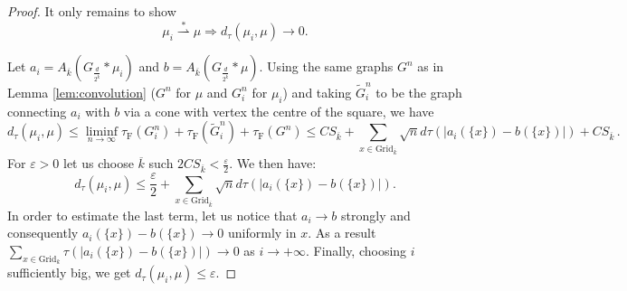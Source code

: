 \documentclass[10pt,a4paper,oneside,final]{article}
\newcommand{\grid}[1]{\mathrm{Grid}_{#1}}
\newcommand{\weakstarto}{\stackrel{*}{\rightharpoonup}}
\newcommand{\Wd}[1]{\mathrm{W}_{#1}}
\newcommand{\JEnXia}[1][\tau]{#1_{\mathrm{F}}}%
\newcommand{\dtau}{d_\tau}
\numberwithin{equation}{section}
\theoremstyle{plain}
\newtheorem{lemma}[theorem]{Lemma}
\theoremstyle{definition}
\theoremstyle{remark}
\begin{document}
{%
%
\begin{proof}%
It only remains to show
\begin{displaymath}
 \mu_i \weakstarto \mu \Longrightarrow \dtau(\mu_i,\mu) \to 0.
\end{displaymath}

Let $a_i = A_{\overline{k}}(G_{\frac{d}{2^{\overline{k}}}}\ast\mu_i)$ and $b = A_{\overline{k}}(G_{\frac{d}{2^{\overline{k}}}}\ast\mu)$.
Using the same graphs $G^n$ as in Lemma \ref{lem:convolution} ($G^n$ for $\mu$ and $G_i^n$ for $\mu_i$) and taking $\tilde G_i^n$ to be the graph connecting $a_i$ with $b$ via a cone with vertex the centre of the square, we have
\begin{displaymath}
 \dtau(\mu_i,\mu)
 \leq\liminf_{n\to\infty}\JEnXia(G_i^n)+\JEnXia(\tilde G_i^n)+\JEnXia(G^n)
 \leq C S_{\overline{k}} + \sum_{x \in \grid{\overline{k}}} \sqrt{n}d \tau(|a_i(\{x\})-b(\{x\})|) + C S_{\overline{k}}\,.
\end{displaymath}
For $\varepsilon > 0$ let us choose $\overline{k}$ such $2C S_{\overline{k}} < \frac{\varepsilon}{2}$. We then have:
\begin{displaymath}
 \dtau(\mu_i,\mu) \leq \frac{\varepsilon}{2} + \sum_{x \in \grid{\overline{k}}} \sqrt{n}d \tau(|a_i(\{x\})-b(\{x\})|).
\end{displaymath}
In order to estimate the last term, let us notice that $a_i \to b$ strongly and consequently $a_i(\{x\})-b(\{x\}) \to 0$ uniformly in $x$. As a result $\sum_{x \in \grid{k}} \tau(|a_i(\{x\})-b(\{x\})|) \to 0$ as $i \to +\infty$. Finally, choosing $i$ sufficiently big, we get $\dtau(\mu_i,\mu) \leq \varepsilon$.


\end{proof}}
\end{document}
